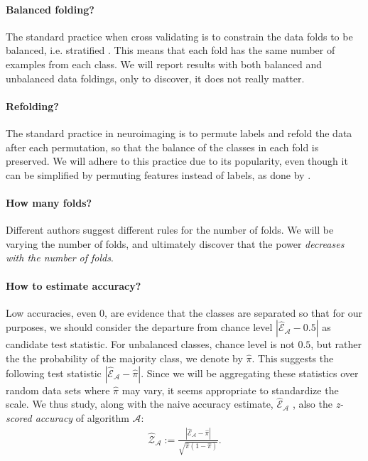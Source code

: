 \documentclass[12pt,a4paper]{article}
\theoremstyle{definition}
\newcommand{\accEstim}{\hat{\mathcal{E}}}
\newcommand{\accZ}{\hat{\mathcal{Z}}}
\newcommand{\majority}{\hat{\pi}}
\newcommand{\algo}{\mathcal{A}}
\begin{document}
\paragraph{Balanced folding?}
The standard practice when cross validating is to constrain the data folds to be balanced, i.e. stratified \citep[e.g.][]{ojala_permutation_2010}.
This means that each fold has the same number of examples from each class. 
We will report results with both balanced and unbalanced data foldings, only to discover, it does not really matter. 


\paragraph{Refolding?}
The standard practice in neuroimaging is to permute labels and refold the data after each permutation, so that the balance of the classes in each fold is preserved.
We will adhere to this practice due to its popularity, even though it can be simplified by permuting features instead of labels, as done by \citet{golland_permutation_2005}.


\paragraph{How many folds?}
Different authors suggest different rules for the number of folds. 
We will be varying the number of folds, and ultimately discover that the power \emph{decreases with the number of folds}. 

\paragraph{How to estimate accuracy?}
\label{sec:estimate_accuracy}
Low accuracies, even $0$, are evidence that the classes are separated so that for our purposes, we should consider the departure from chance level $|\accEstim_{\algo}-0.5|$ as candidate test statistic.
For unbalanced classes, chance level is not $0.5$, but rather the the probability of the majority class, we denote by $\majority$.
This suggests the following test statistic $|\accEstim_{\algo}-\majority|$.
Since we will be aggregating these statistics over random data sets where $\majority$ may vary, it seems appropriate to standardize the scale. 
We thus study, along with the naive accuracy estimate, $\accEstim_{\algo}$ , also the \emph{z-scored accuracy} of algorithm $\algo$:
\begin{align}
\label{eq:z_scored_accuracy}
	\accZ_{\algo} := \frac{|\accEstim_{\algo}-\majority|}{\sqrt{\majority(1-\majority)}}.
\end{align} 
\end{document}
